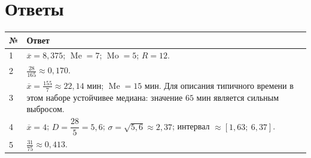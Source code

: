 \documentclass[a4paper,12pt]{article}
\newcommand{\Me}{\operatorname{Me}}
\newcommand{\Mo}{\operatorname{Mo}}
\begin{document}
\newpage
\section*{Ответы}

\renewcommand{\arraystretch}{1.45}
\begin{center}
\begin{tabularx}{\linewidth}{@{}p{12mm}X@{}}
\toprule
\textbf{№} & \textbf{Ответ} \\
\midrule
1 & $\overline{x}=8{,}375$; $\Me=7$; $\Mo=5$; $R=12$. \\
2 & $\displaystyle \frac{28}{165}\approx0{,}170$. \\
3 & $\displaystyle \overline{x}=\frac{155}{7}\approx22{,}14$ мин; $\Me=15$ мин. Для описания типичного времени в этом наборе устойчивее медиана: значение $65$ мин является сильным выбросом. \\
4 & $\overline{x}=4$; $D=\dfrac{28}{5}=5{,}6$; $\sigma=\sqrt{5{,}6}\approx2{,}37$; интервал $\approx[1{,}63;\ 6{,}37]$. \\
5 & $\displaystyle \frac{31}{75}\approx0{,}413$. \\
\bottomrule
\end{tabularx}
\end{center}
\end{document}
